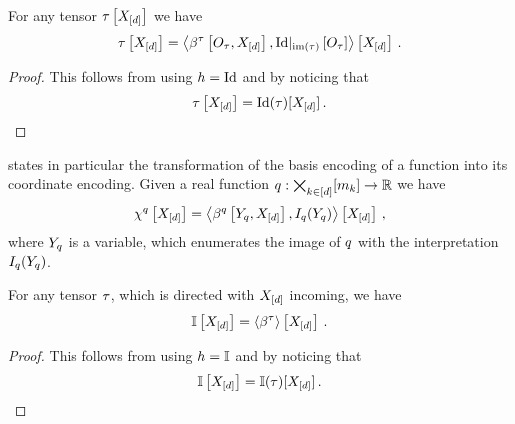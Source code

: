 \begin{corollary}
    \label{cor:rhoToNormal}
    For any tensor $\tau\left[X_{[d]}\right]$ we have
    \begin{align*}
        \tau\left[X_{[d]}\right]
        = \left\langle \beta^{\tau}\left[O_{\tau},X_{[d]}\right],{\mathrm{Id}}|_{\mathrm{im}\left(\tau\right)}\left[O_{\tau}\right]\right\rangle \left[ X_{[d]} \right] \, .
    \end{align*}
\end{corollary}
\begin{proof}
    This follows from  using $h=\mathrm{Id}$ and by noticing that
    \begin{align*}
        \tau\left[X_{[d]}\right] = \mathrm{Id}(\tau)[X_{[d]}] \, .
    \end{align*}
\end{proof}

\begin{remark}
     states in particular the transformation of the basis encoding of a function into its coordinate encoding.
    Given a real function $q:\bigtimes_{k\in[d]}[m_{k}]\rightarrow\mathbb{R}$ we have
    \begin{align*}
        \chi^{q}\left[X_{[d]}\right]
        = \left\langle \beta^{q}\left[Y_{q},X_{[d]}\right],I_{q}(Y_{q})\right\rangle \left[ X_{[d]} \right] \, ,
    \end{align*}
    where $Y_{q}$ is a variable, which enumerates the image of $q$ with the interpretation $I_{q}(Y_{q})$.
\end{remark}


\begin{corollary}
    \label{cor:onesHead}
    For any tensor $\tau$, which is directed with $X_{[d]}$ incoming, we have
    \[ \mathbb{I}\left[X_{[d]}\right] = \left\langle \beta^{\tau}\right\rangle \left[ X_{[d]} \right] \, . \]
\end{corollary}
\begin{proof}
    This follows from  using $h=\mathbb{I}$ and by noticing that
    \begin{align*}
        \mathbb{I}\left[X_{[d]}\right] = \mathbb{I}(\tau)[X_{[d]}] \, .
    \end{align*}
\end{proof}


